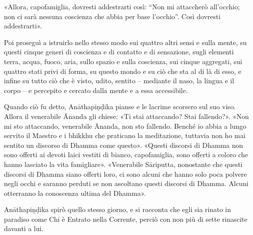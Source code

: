  «Allora, capofamiglia, dovresti addestrarti così: “Non mi
attaccherò all’occhio; non ci sarà nessuna coscienza che abbia per base
l’occhio”. Così dovresti addestrarti».

 Poi proseguì a istruirlo nello stesso modo sui
quattro altri sensi e sulla mente, su questi cinque generi di coscienza e di
contatto e di sensazione, sugli elementi terra, acqua, fuoco, aria, sullo spazio
e sulla coscienza, sui cinque aggregati, sui quattro stati privi di forma, su
questo mondo e su ciò che sta al di là di esso, e infine su tutto ciò che è
visto, udito, sentito – mediante il naso, la lingua e il corpo – e percepito e
cercato dalla mente e a essa accessibile.

 Quando ciò fu detto, Anāthapiṇḍika pianse e le lacrime
scorsero sul suo viso. Allora il venerabile Ānanda gli chiese: «Ti stai
attaccando? Stai fallendo?». «Non mi sto attaccando, venerabile Ānanda, non sto
fallendo. Benché io abbia a lungo servito il Maestro e i bhikkhu che praticano
la meditazione, tuttavia non ho mai sentito un discorso di Dhamma come questo».
«Questi discorsi di Dhamma non sono offerti ai devoti laici vestiti di bianco,
capofamiglia, sono offerti a coloro che hanno lasciato la vita famigliare».
«Venerabile Sāriputta, nonostante che questi discorsi di Dhamma siano offerti
loro, ci sono alcuni che hanno solo poca polvere negli occhi e saranno perduti
se non ascoltano questi discorsi di Dhamma. Alcuni otterranno la conoscenza
ultima del Dhamma».


 Anāthapiṇḍika spirò quello stesso giorno, e si
racconta che egli sia rinato in paradiso come Chi è Entrato nella Corrente,
perciò con non più di sette rinascite davanti a lui.

